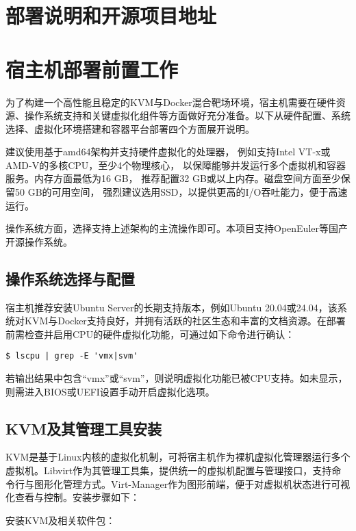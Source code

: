 \documentclass[lang=cn,10pt]{elegantbook}
\begin{document}
\section{部署说明和开源项目地址}

\section{宿主机部署前置工作}

为了构建一个高性能且稳定的KVM与Docker混合靶场环境，宿主机需要在硬件资源、操作系统支持和关键虚拟化组件等方面做好充分准备。以下从硬件配置、系统选择、虚拟化环境搭建和容器平台部署四个方面展开说明。

\begin{proposition}
建议使用基于amd64架构并支持硬件虚拟化的处理器，
例如支持Intel VT-x或AMD-V的多核CPU，至少4个物理核心，
以保障能够并发运行多个虚拟机和容器服务。内存方面最低为16 GB，
推荐配置32 GB或以上内存。磁盘空间方面至少保留50 GB的可用空间，
强烈建议选用SSD，以提供更高的I/O吞吐能力，便于高速运行。

操作系统方面，选择支持上述架构的主流操作即可。本项目支持OpenEuler等国产开源操作系统。
\end{proposition}


\subsection{操作系统选择与配置}

宿主机推荐安装Ubuntu Server的长期支持版本，例如Ubuntu 20.04或24.04，该系统对KVM与Docker支持良好，并拥有活跃的社区生态和丰富的文档资源。在部署前需检查并启用CPU的硬件虚拟化功能，可通过如下命令进行确认：


\begin{verbatim}
$ lscpu | grep -E 'vmx|svm'
\end{verbatim}

若输出结果中包含“vmx”或“svm”，则说明虚拟化功能已被CPU支持。如未显示，则需进入BIOS或UEFI设置手动开启虚拟化选项。

\subsection{KVM及其管理工具安装}

KVM是基于Linux内核的虚拟化机制，可将宿主机作为裸机虚拟化管理器运行多个虚拟机。Libvirt作为其管理工具集，提供统一的虚拟机配置与管理接口，支持命令行与图形化管理方式。Virt-Manager作为图形前端，便于对虚拟机状态进行可视化查看与控制。安装步骤如下：

安装KVM及相关软件包：
\end{document}
